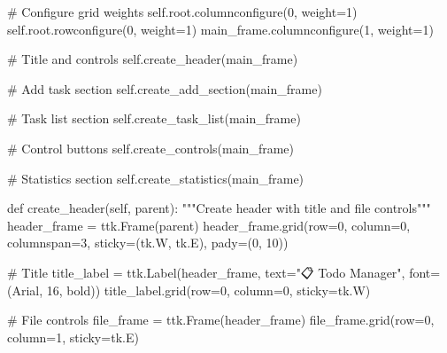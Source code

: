 \documentclass[
  letterpaper,
  DIV=11,
  numbers=noendperiod,
  oneside]{scrreprt}
\newenvironment{Shaded}{}{}
\newcommand{\CommentTok}[1]{\textcolor[rgb]{0.42,0.45,0.49}{#1}}
\newcommand{\DecValTok}[1]{\textcolor[rgb]{0.00,0.36,0.77}{#1}}
\newcommand{\KeywordTok}[1]{\textcolor[rgb]{0.84,0.23,0.29}{#1}}
\newcommand{\NormalTok}[1]{\textcolor[rgb]{0.14,0.16,0.18}{#1}}
\newcommand{\OperatorTok}[1]{\textcolor[rgb]{0.14,0.16,0.18}{#1}}
\newcommand{\StringTok}[1]{\textcolor[rgb]{0.01,0.18,0.38}{#1}}
\newcommand{\VariableTok}[1]{\textcolor[rgb]{0.89,0.38,0.04}{#1}}
\begin{document}
\begin{Shaded}
\begin{Highlighting}[]
        \CommentTok{\# Configure grid weights}
        \VariableTok{self}\NormalTok{.root.columnconfigure(}\DecValTok{0}\NormalTok{, weight}\OperatorTok{=}\DecValTok{1}\NormalTok{)}
        \VariableTok{self}\NormalTok{.root.rowconfigure(}\DecValTok{0}\NormalTok{, weight}\OperatorTok{=}\DecValTok{1}\NormalTok{)}
\NormalTok{        main\_frame.columnconfigure(}\DecValTok{1}\NormalTok{, weight}\OperatorTok{=}\DecValTok{1}\NormalTok{)}
        
        \CommentTok{\# Title and controls}
        \VariableTok{self}\NormalTok{.create\_header(main\_frame)}
        
        \CommentTok{\# Add task section}
        \VariableTok{self}\NormalTok{.create\_add\_section(main\_frame)}
        
        \CommentTok{\# Task list section}
        \VariableTok{self}\NormalTok{.create\_task\_list(main\_frame)}
        
        \CommentTok{\# Control buttons}
        \VariableTok{self}\NormalTok{.create\_controls(main\_frame)}
        
        \CommentTok{\# Statistics section}
        \VariableTok{self}\NormalTok{.create\_statistics(main\_frame)}
    
    \KeywordTok{def}\NormalTok{ create\_header(}\VariableTok{self}\NormalTok{, parent):}
        \CommentTok{"""Create header with title and file controls"""}
\NormalTok{        header\_frame }\OperatorTok{=}\NormalTok{ ttk.Frame(parent)}
\NormalTok{        header\_frame.grid(row}\OperatorTok{=}\DecValTok{0}\NormalTok{, column}\OperatorTok{=}\DecValTok{0}\NormalTok{, columnspan}\OperatorTok{=}\DecValTok{3}\NormalTok{, sticky}\OperatorTok{=}\NormalTok{(tk.W, tk.E), pady}\OperatorTok{=}\NormalTok{(}\DecValTok{0}\NormalTok{, }\DecValTok{10}\NormalTok{))}
        
        \CommentTok{\# Title}
\NormalTok{        title\_label }\OperatorTok{=}\NormalTok{ ttk.Label(header\_frame, text}\OperatorTok{=}\StringTok{"📋 Todo Manager"}\NormalTok{, }
\NormalTok{                               font}\OperatorTok{=}\NormalTok{(}\StringTok{\textquotesingle{}Arial\textquotesingle{}}\NormalTok{, }\DecValTok{16}\NormalTok{, }\StringTok{\textquotesingle{}bold\textquotesingle{}}\NormalTok{))}
\NormalTok{        title\_label.grid(row}\OperatorTok{=}\DecValTok{0}\NormalTok{, column}\OperatorTok{=}\DecValTok{0}\NormalTok{, sticky}\OperatorTok{=}\NormalTok{tk.W)}
        
        \CommentTok{\# File controls}
\NormalTok{        file\_frame }\OperatorTok{=}\NormalTok{ ttk.Frame(header\_frame)}
\NormalTok{        file\_frame.grid(row}\OperatorTok{=}\DecValTok{0}\NormalTok{, column}\OperatorTok{=}\DecValTok{1}\NormalTok{, sticky}\OperatorTok{=}\NormalTok{tk.E)}
        

\end{Highlighting}
\end{Shaded}
\end{document}
